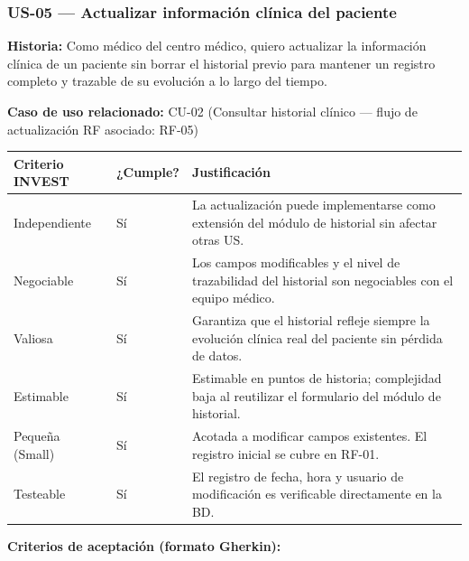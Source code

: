 \documentclass[11pt,a4paper]{article}
\begin{document}
	\subsubsection{US-05 --- Actualizar información clínica del paciente}
	
	\textbf{Historia:} Como médico del centro médico, quiero actualizar la información clínica de un paciente sin borrar el historial previo para mantener un registro completo y trazable de su evolución a lo largo del tiempo.
	
	\textbf{Caso de uso relacionado:} CU-02 (Consultar historial clínico --- flujo de actualización \textbar{} RF asociado: RF-05)
	
	\begin{longtable}{p{} p{} p{}}
		
		
		\toprule
		\textbf{Criterio INVEST} &
		\textbf{¿Cumple?} &
		\textbf{Justificación} \\
		\midrule
		\endhead
		
		Independiente & Sí & La actualización puede implementarse como extensión del módulo de historial sin afectar otras US. \\
		Negociable & Sí & Los campos modificables y el nivel de trazabilidad del historial son negociables con el equipo médico. \\
		Valiosa & Sí & Garantiza que el historial refleje siempre la evolución clínica real del paciente sin pérdida de datos. \\
		Estimable & Sí & Estimable en puntos de historia; complejidad baja al reutilizar el formulario del módulo de historial. \\
		Pequeña (Small) & Sí & Acotada a modificar campos existentes. El registro inicial se cubre en RF-01. \\
		Testeable & Sí & El registro de fecha, hora y usuario de modificación es verificable directamente en la BD. \\
		
		\bottomrule
	\end{longtable}
	
	\textbf{Criterios de aceptación (formato Gherkin):}
	
\end{document}
